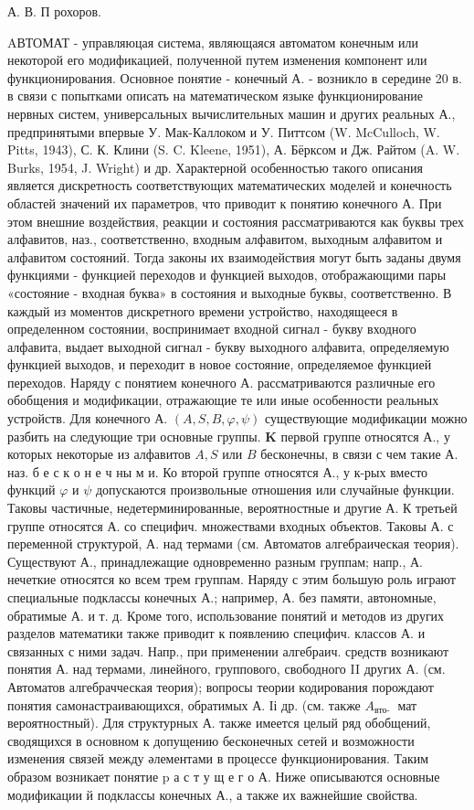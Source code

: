 \documentclass[10pt]{article}
\begin{document}
А. В. П рохоров.



AВТОМАТ - управляюцая система, являющаяся автоматом конечным или некоторой его модификацией, полученной путем изменения компонент или функционирования. Основное понятие - конечный А. - возникло в середине 20 в. в связи с попытками описать на математическом языке функционирование нервных систем, универсальных вычислительных машин и других реальных А., предпринятыми впервые У. Мак-Каллоком и У. Питтсом (W. McCulloch, W. Pitts, 1943), С. К. Клини (S. C. Kleene, 1951), А. Бёрксом и Дж. Райтом (A. W. Burks, 1954, J. Wright) и др. Характерной особенностью такого описания является дискретность соответствующих математических моделей и конечность областей значений их параметров, что приводит к понятию конечного А. При этом внешние воздействия, реакции и состояния рассматриваются как буквы трех алфавитов, наз., соответственно, входным алфавитом, выходным алфавитом и алфавитом состояний. Тогда законы их взаимодействия могут быть заданы двумя функциями - функцией переходов и функцией выходов, отображающими пары «состояние - входная буква» в состояния и выходные буквы, соответственно. В каждый из моментов дискретного времени устройство, находящееся в определенном состоянии, воспринимает входной сигнал - букву входного алфавита, выдает выходной сигнал - букву выходного алфавита, определяемую функцией выходов, и переходит в новое состояние, определяемое функцией переходов. Наряду с понятием конечного А. рассматриваются различные его обобщения и модификации, отражающие те или иные особенности реальных устройств. Для конечного А. $(A, S, B, \varphi, \psi)$ существующие модификации можно разбить на следующие три основные группы. $\boldsymbol{K}$ первой группе относятся А., у которых некоторые из алфавитов $A, S$ или $B$ бесконечны, в связи с чем такие А. наз. б е с к о н е ч ны м и. Ко второй группе относятся А., у к-рых вместо функций $\varphi$ и $\psi$ допускаются произвольные отношения или случайные функции. Таковы частичные, недетерминированные, вероятностные и другие А. К третьей группе относятся А. со специфич. множествами входных объектов. Таковы А. с переменной структурой, А. над термами (см. Автоматов алгебраическая теория). Существуют А., принадлежащие одновременно разным группам; напр., А. нечеткие относятся ко всем трем группам. Наряду с этим большую роль играют специальные подклассы конечных А.; например, А. без памяти, автономные, обратимые А. и т. д. Кроме того, использование понятий и методов из других разделов математики также приводит к появлению специфич. классов А. и связанных с ними задач. Напр., при применении алгебраич. средств возникают понятия А. над термами, линейного, группового, свободного II других А. (см. Автоматов алгебрачческая теория); вопросы теории кодирования порождают понятия самонастраивающихся, обратимых А. Іі др. (см. также $A_{\text {вто- }}$ мат вероятностный). Для структурных А. также имеется целый ряд обобщений, сводящихся в основном к допущению бесконечных сетей и возможности изменения связей между әлементами в процессе функционирования. Таким образом возникает понятие $\mathrm{p}$ а с т у щ е г о А. Ниже описываются основные модификации й подклассы конечных А., а также их важнейшие свойства.
\end{document}
